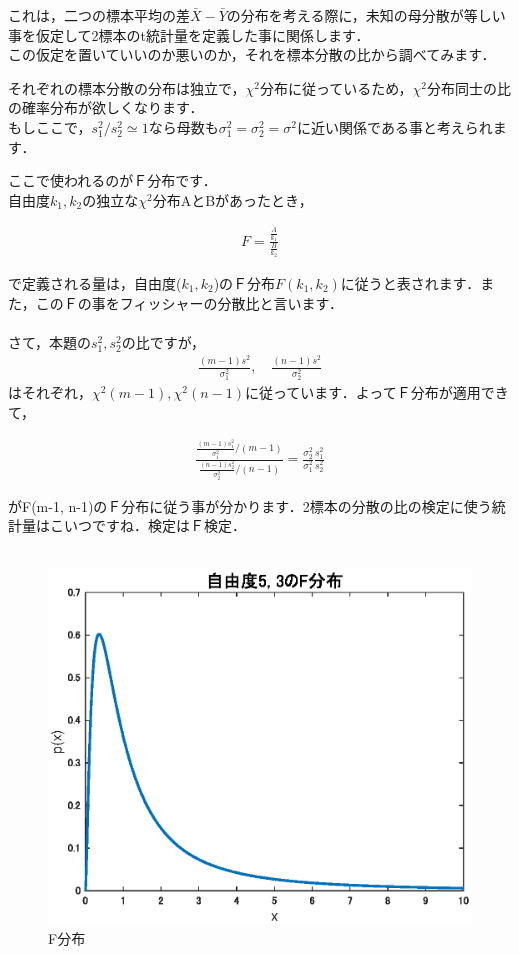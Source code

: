 \documentclass[11pt,a4paper,uplatex]{ujreport} 	%
\begin{document}
これは，二つの標本平均の差$\bar{X}-\bar{Y}$の分布を考える際に，未知の母分散が等しい事を仮定して2標本のt統計量を定義した事に関係します．\\

この仮定を置いていいのか悪いのか，それを標本分散の比から調べてみます．


それぞれの標本分散の分布は独立で，$\chi^2$分布に従っているため，$\chi^2$分布同士の比の確率分布が欲しくなります．\\

もしここで，$s_1^2/s_2^2≃1$なら母数も$\sigma_1^2 = \sigma_2^2=\sigma^2$に近い関係である事と考えられます．

ここで使われるのがＦ分布です．\\

自由度$k_1, k_2$の独立な$\chi^2$分布AとBがあったとき，

\begin{align}
  F = \frac{\frac{A}{k_1}}{\frac{B}{k_2}}
\end{align}

で定義される量は，自由度($k_1,k_2$)のＦ分布$F(k_1,k_2)$に従うと表されます．また，このＦの事をフィッシャーの分散比と言います．\\
\\

さて，本題の$s_1^2, s_2^2$の比ですが，
\begin{align}
  \frac{(m-1)s^2}{\sigma_1^2}, \quad \frac{(n-1)s^2}{\sigma_2^2}
\end{align}
はそれぞれ，$\chi^2(m-1), \chi^2(n-1)$に従っています．よってＦ分布が適用できて，

\begin{align}
  \frac{\frac{(m-1)s_1^2}{\sigma_1^2} / (m-1)}{\frac{(n-1)s_2^2}{\sigma_2^2} / (n-1)} = \frac{\sigma_2^2}{\sigma_1^2}\frac{s_1^2}{s_2^2}
  \label{eq:fisher}
\end{align}

がF(m-1, n-1)のＦ分布に従う事が分かります．2標本の分散の比の検定に使う統計量はこいつですね．検定はＦ検定．\\
\\

\begin{figure}[H]
  \centering
  \includegraphics[width=12cm]{../figures/f_dist.eps}
  \caption{F分布}
\end{figure}
\end{document}
